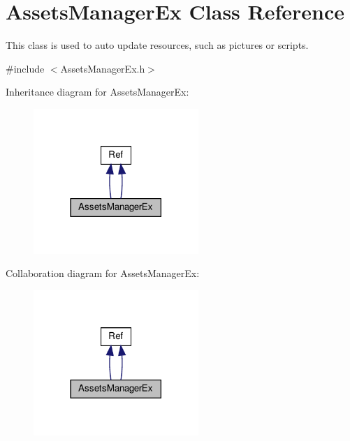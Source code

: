 \hypertarget{classAssetsManagerEx}{}\section{Assets\+Manager\+Ex Class Reference}
\label{classAssetsManagerEx}


This class is used to auto update resources, such as pictures or scripts.  




{\ttfamily \#include $<$Assets\+Manager\+Ex.\+h$>$}



Inheritance diagram for Assets\+Manager\+Ex\+:
\nopagebreak
\begin{figure}[H]
\begin{center}
\leavevmode
\includegraphics[width=177pt]{classAssetsManagerEx__inherit__graph}
\end{center}
\end{figure}


Collaboration diagram for Assets\+Manager\+Ex\+:
\nopagebreak
\begin{figure}[H]
\begin{center}
\leavevmode
\includegraphics[width=177pt]{classAssetsManagerEx__coll__graph}
\end{center}
\end{figure}
